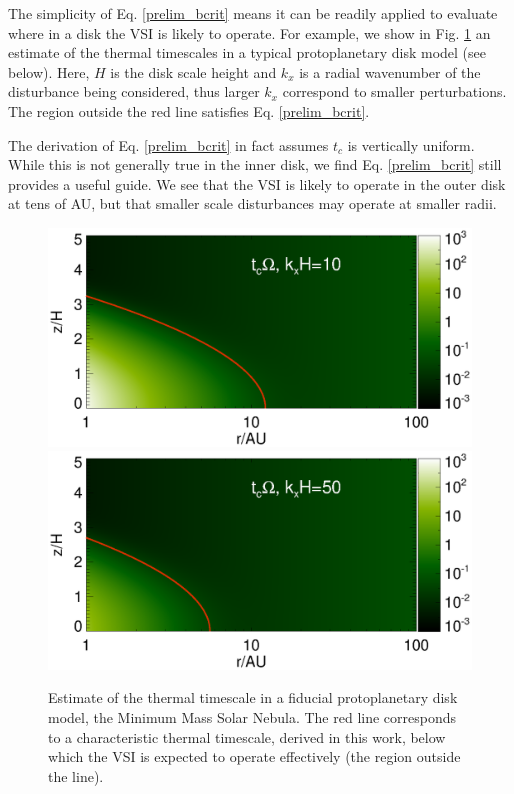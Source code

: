 \documentclass[iop]{emulateapj}
\begin{document}

The simplicity of Eq. \ref{prelim_bcrit} means it can be 
readily applied to evaluate where in a disk the VSI is likely to
operate. For example, we show in Fig. \ref{bcrit_mmsn2d} an estimate
of the thermal timescales in a typical protoplanetary disk model (see 
below). Here, $H$ is the disk scale height and $k_x$ is a radial
wavenumber of the disturbance being considered, thus larger $k_x$
correspond to smaller perturbations. The region outside the red line
satisfies Eq. \ref{prelim_bcrit}.

The derivation of Eq. \ref{prelim_bcrit} in fact
assumes $t_c$ is vertically uniform. While this is not generally true
in the inner disk, we find Eq. \ref{prelim_bcrit} still provides a
useful guide. We see that the VSI is likely to  operate in the outer 
disk at tens of AU, but that smaller scale disturbances may operate at
smaller radii. 

\begin{figure}
  \includegraphics[width=\linewidth,clip=true,trim=0cm 1.7cm 0cm
  0.73cm]{figures/bcrit_mmsn2d_kx10}
  \includegraphics[width=\linewidth,clip=true,trim=0cm 0.46cm 0cm
  0.73cm]{figures/bcrit_mmsn2d_kx50}
  \caption{Estimate of the thermal timescale  in a fiducial 
    protoplanetary disk model, the Minimum Mass Solar Nebula. The red
    line corresponds to a characteristic thermal timescale, derived in
    this work, below which the VSI is expected to operate effectively
    (the region outside the line).    
    \label{bcrit_mmsn2d} 
  }
\end{figure}
\end{document}
